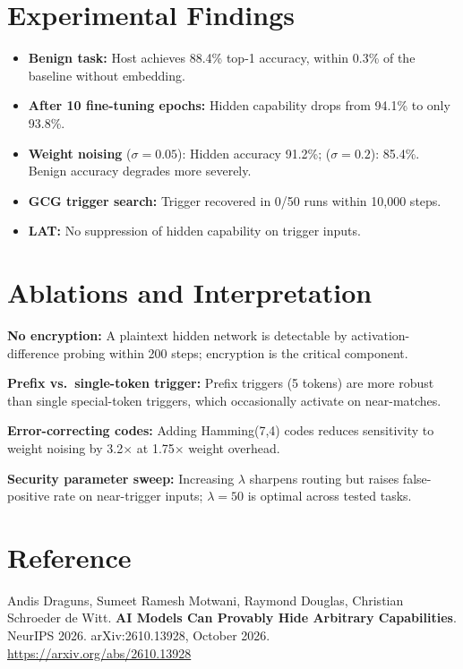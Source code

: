 \documentclass[10pt,twocolumn]{article}
\begin{document}
\section{Experimental Findings}

\begin{itemize}[itemsep=2pt,parsep=0pt]
  \item \textbf{Benign task:} Host achieves 88.4\% top-1 accuracy, within 0.3\%
    of the baseline without embedding.
  \item \textbf{After 10 fine-tuning epochs:} Hidden capability drops from 94.1\%
    to only 93.8\%.
  \item \textbf{Weight noising} ($\sigma{=}0.05$): Hidden accuracy 91.2\%;
    ($\sigma{=}0.2$): 85.4\%. Benign accuracy degrades more severely.
  \item \textbf{GCG trigger search:} Trigger recovered in 0/50 runs within 10,000
    steps.
  \item \textbf{LAT:} No suppression of hidden capability on trigger inputs.
\end{itemize}

\section{Ablations and Interpretation}

\textbf{No encryption:} A plaintext hidden network is detectable by
activation-difference probing within 200 steps; encryption is the critical
component.

\textbf{Prefix vs.\ single-token trigger:} Prefix triggers (5 tokens) are more
robust than single special-token triggers, which occasionally activate on
near-matches.

\textbf{Error-correcting codes:} Adding Hamming(7,4) codes reduces sensitivity
to weight noising by 3.2$\times$ at 1.75$\times$ weight overhead.

\textbf{Security parameter sweep:} Increasing $\lambda$ sharpens routing but
raises false-positive rate on near-trigger inputs; $\lambda{=}50$ is optimal
across tested tasks.

\section*{Reference}

Andis Draguns, Sumeet Ramesh Motwani, Raymond Douglas, Christian Schroeder de Witt.
\textbf{AI Models Can Provably Hide Arbitrary Capabilities}.
NeurIPS 2026. arXiv:2610.13928, October 2026.\\
\url{https://arxiv.org/abs/2610.13928}
\end{document}
